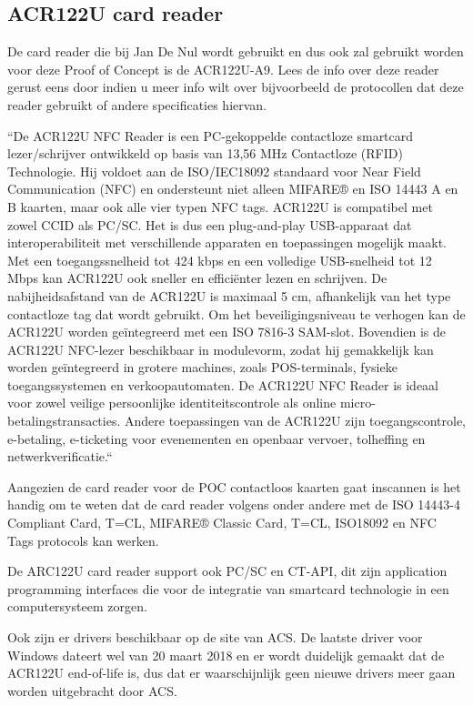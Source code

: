 \subsection{ACR122U card reader}
De card reader die bij Jan De Nul wordt gebruikt en dus ook zal gebruikt worden voor deze Proof of Concept is de ACR122U-A9. Lees de info over deze reader gerust eens door indien u meer info wilt over bijvoorbeeld de protocollen dat deze reader gebruikt of andere specificaties hiervan.

``De ACR122U NFC Reader is een PC-gekoppelde contactloze smartcard lezer/schrijver ontwikkeld op basis van 13,56 MHz Contactloze (RFID) Technologie. Hij voldoet aan de ISO/IEC18092 standaard voor Near Field Communication (NFC) en ondersteunt niet alleen MIFARE® en ISO 14443 A en B kaarten, maar ook alle vier typen NFC tags.
ACR122U is compatibel met zowel CCID als PC/SC. Het is dus een plug-and-play USB-apparaat dat interoperabiliteit met verschillende apparaten en toepassingen mogelijk maakt. Met een toegangssnelheid tot 424 kbps en een volledige USB-snelheid tot 12 Mbps kan ACR122U ook sneller en efficiënter lezen en schrijven. De nabijheidsafstand van de ACR122U is maximaal 5 cm, afhankelijk van het type contactloze tag dat wordt gebruikt.
Om het beveiligingsniveau te verhogen kan de ACR122U worden geïntegreerd met een ISO 7816-3 SAM-slot. Bovendien is de ACR122U NFC-lezer beschikbaar in modulevorm, zodat hij gemakkelijk kan worden geïntegreerd in grotere machines, zoals POS-terminals, fysieke toegangssystemen en verkoopautomaten.
De ACR122U NFC Reader is ideaal voor zowel veilige persoonlijke identiteitscontrole als online micro-betalingstransacties. Andere toepassingen van de ACR122U zijn toegangscontrole, e-betaling, e-ticketing voor evenementen en openbaar vervoer, tolheffing en netwerkverificatie.``\autocite{ACSACR122U}

Aangezien de card reader voor de POC contactloos kaarten gaat inscannen is het handig om te weten dat de card reader volgens \textcite{ACSACR122U} onder andere met de ISO 14443-4 Compliant Card, T=CL, MIFARE® Classic Card, T=CL, ISO18092 en NFC Tags protocols kan werken.

De ARC122U card reader support ook PC/SC en CT-API, dit zijn application programming interfaces die voor de integratie van smartcard technologie in een computersysteem zorgen.

Ook zijn er drivers beschikbaar op de site van ACS. De laatste driver voor Windows dateert wel van 20 maart 2018 en er wordt duidelijk gemaakt dat de ACR122U end-of-life is, dus dat er waarschijnlijk geen nieuwe drivers meer gaan worden uitgebracht door ACS.




